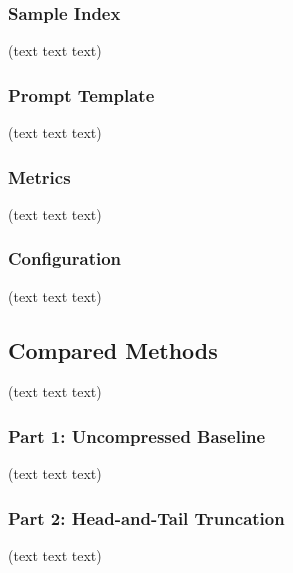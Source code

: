 \documentclass[10pt,a4paper,twocolumn]{article}
\begin{document}

\subsubsection{Sample Index}
(text text text)


\subsubsection{Prompt Template}
(text text text)


\subsubsection{Metrics}
(text text text)


\subsubsection{Configuration}
(text text text)


\subsection{Compared Methods}
(text text text)


\subsubsection{Part 1: Uncompressed Baseline}
(text text text)


\subsubsection{Part 2: Head-and-Tail Truncation}
(text text text)
\end{document}
